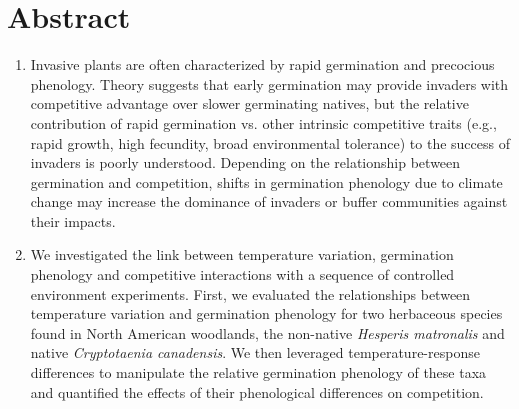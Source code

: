 \documentclass{article}[11pt]
\begin{document}
\section*{Abstract}
\begin{enumerate}
\item Invasive plants are often characterized by rapid germination and precocious phenology. Theory suggests that early germination may provide invaders with competitive advantage over slower germinating natives, but the relative contribution of rapid germination vs. other intrinsic competitive traits (e.g., rapid growth, high fecundity, broad environmental tolerance) to the success of invaders is poorly understood. Depending on the relationship between germination and competition, shifts in germination phenology due to climate change may increase the dominance of invaders or buffer communities against their impacts. %

\item We investigated the link between temperature variation, germination phenology and competitive interactions with a sequence of controlled environment experiments. First, we evaluated the relationships between temperature variation and germination phenology for two herbaceous species found in North American woodlands, the non-native \textit{Hesperis matronalis} and native \textit{Cryptotaenia canadensis}. We then leveraged temperature-response differences to manipulate the relative germination phenology of these taxa and quantified the effects of their phenological differences on competition.


\end{enumerate}
\end{document}
